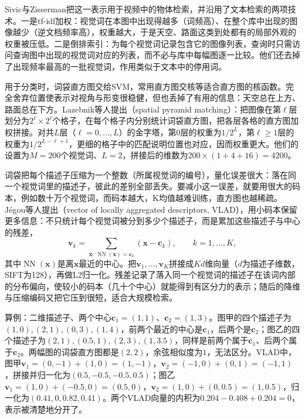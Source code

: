 Sivic与Zisserman把这一表示用于视频中的物体检索，并沿用了文本检索的两项技术。一是tf-idf加权：视觉词在本图中出现得越多（词频高）、在整个库中出现的图像越少（逆文档频率高），权重越大，于是天空、路面这类到处都有的局部外观的权重被压低。二是倒排索引：为每个视觉词记录包含它的图像列表，查询时只需访问查询图中出现的视觉词对应的列表，而不必与库中每幅图逐一比较。他们还去掉了出现频率最高的一批视觉词，作用类似于文本中的停用词。

用于分类时，词袋直方图交给SVM，常用直方图交核等适合直方图的核函数。完全舍弃位置使表示对视角与形变很稳健，但也丢掉了有用的信息：天空总在上方、路面总在下方。Lazebnik等人提出（spatial pyramid matching）：把图像在第$\ell$层划分为$2^\ell\times2^\ell$个格子，在每个格子内分别统计词袋直方图，把各层各格的直方图加权拼接。对共$L$层（$\ell=0,\ldots,L$）的金字塔，第0层的权重为$1/2^L$，第$\ell\geq1$层的权重为$1/2^{L-\ell+1}$，更细的格子中的匹配说明位置也对应，因而权重更大。他们的设置为$M=200$个视觉词、$L=2$，拼接后的维数为$200\times(1+4+16)=4200$。

词袋把每个描述子压缩为一个整数（所属视觉词的编号），量化误差很大：落在同一个视觉词里的描述子，彼此的差别全部丢失。要减小这一误差，就要用很大的码本，例如数十万个视觉词，而码本越大，K均值越难训练，直方图也越稀疏。Jégou等人提出（vector of locally aggregated descriptors, VLAD），用小码本保留更多信息：不只统计每个视觉词被分到多少个描述子，而是累加这些描述子与中心的残差，
\begin{equation}
  \bm v_k=\sum_{\bm x:\,\operatorname{NN}(\bm x)=\bm c_k}(\bm x-\bm c_k),\qquad k=1,\ldots,K,
  \label{eq:vision-features-vlad}
\end{equation}
其中$\operatorname{NN}(\bm x)$是离$\bm x$最近的中心。把$\bm v_1,\ldots,\bm v_K$拼接成$Kd$维向量（$d$为描述子维数，SIFT为128），再做L2归一化。残差记录了落入同一个视觉词的描述子在该词内部的分布偏向，使较小的码本（几十个中心）就能得到有区分力的表示；随后的降维与压缩编码又把它压到很短，适合大规模检索。

算例：二维描述子、两个中心$\bm c_1=(1,1)$、$\bm c_2=(1,3)$。图甲的四个描述子为$(1,0),(2,1),(0,3),(1,4)$，前两个最近的中心是$\bm c_1$，后两个是$\bm c_2$；图乙的四个描述子为$(2,1),(0.5,1),(2,3),(1,3.5)$，同样是前两个属于$\bm c_1$、后两个属于$\bm c_2$。两幅图的词袋直方图都是$(2,2)$，余弦相似度为$1$，无法区分。VLAD中，图甲$\bm v_1=(0,-1)+(1,0)=(1,-1)$，$\bm v_2=(-1,0)+(0,1)=(-1,1)$，拼接并归一化为$(0.5,-0.5,-0.5,0.5)$；图乙$\bm v_1=(1,0)+(-0.5,0)=(0.5,0)$，$\bm v_2=(1,0)+(0,0.5)=(1,0.5)$，归一化为$(0.41,0,0.82,0.41)$。两个VLAD向量的内积为$0.204-0.408+0.204=0$，表示被清楚地分开了。

